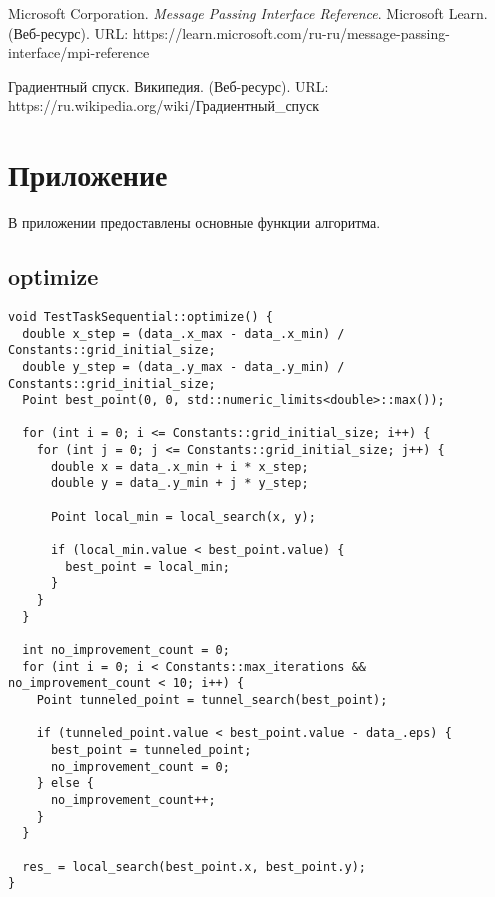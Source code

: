 \documentclass[12pt]{article}
\begin{document}
\begin{thebibliography}{2}

Microsoft Corporation.
\emph{Message Passing Interface Reference}.
Microsoft Learn. (Веб-ресурс). URL: https://learn.microsoft.com/ru-ru/message-passing-interface/mpi-reference

Градиентный спуск. Википедия. (Веб-ресурс). URL: https://ru.wikipedia.org/wiki/Градиентный\_спуск

\end{thebibliography}
\newpage

\section{Приложение}
В приложении предоставлены основные функции алгоритма. 
\subsection{optimize}
\begin{verbatim}
void TestTaskSequential::optimize() {
  double x_step = (data_.x_max - data_.x_min) / Constants::grid_initial_size;
  double y_step = (data_.y_max - data_.y_min) / Constants::grid_initial_size;
  Point best_point(0, 0, std::numeric_limits<double>::max());

  for (int i = 0; i <= Constants::grid_initial_size; i++) {
    for (int j = 0; j <= Constants::grid_initial_size; j++) {
      double x = data_.x_min + i * x_step;
      double y = data_.y_min + j * y_step;

      Point local_min = local_search(x, y);

      if (local_min.value < best_point.value) {
        best_point = local_min;
      }
    }
  }

  int no_improvement_count = 0;
  for (int i = 0; i < Constants::max_iterations && no_improvement_count < 10; i++) {
    Point tunneled_point = tunnel_search(best_point);

    if (tunneled_point.value < best_point.value - data_.eps) {
      best_point = tunneled_point;
      no_improvement_count = 0;
    } else {
      no_improvement_count++;
    }
  }

  res_ = local_search(best_point.x, best_point.y);
}
\end{verbatim}
\newpage
\end{document}
